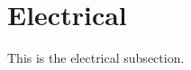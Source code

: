 \documentclass[../vccs_documentation]{subfiles}
\begin{document}
\section{Electrical}
This is the electrical subsection.
\end{document}
